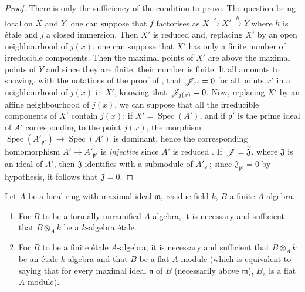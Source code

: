 \begin{proof}
There is only the sufficiency of the condition to prove.
The question being local on $X$ and $Y$, one can suppose  that $f$ factorises as $X\xrightarrow{j}X'\xrightarrow{h}Y$ where $h$ is \'etale and $j$ a closed immersion.
Then $X'$ is reduced  and, replacing $X'$ by an open neighbourhood of $j(x)$, one can suppose that $X'$ has only a finite number of irreducible components.
Then the maximal points of $X'$ are above the maximal points of $Y$  and since they are finite, their number is finite.
It all amounts to showing, with the notations of the proof of , that $\mathscr{J}_{x'}=0$ for all points $x'$ in a neighbourhood of $j(x)$ in $X'$, knowing that $\mathscr{J}_{j(x)}=0$.
Now, replacing $X'$ by an affine neighbourhood of $j(x)$, we can suppose that all the irreducible components of $X'$ contain $j(x)$;
if $X'=\operatorname{Spec}(A')$, and if $\mathfrak{p}'$ is the prime ideal of $A'$ corresponding to the point $j(x)$, the morphism $\operatorname{Spec}(A'_{\mathfrak{p}'})\to\operatorname{Spec}(A')$ is dominant, hence the corresponding homomorphism $A'\to A'_{\mathfrak{p}'}$ is \emph{injective} since $A'$ is reduced .
If $\mathscr{J}=\widetilde{\mathfrak{J}}$, where $\mathfrak{J}$ is an ideal of $A'$, then $\mathfrak{J}$ identifies with a submodule of $A'_{\mathfrak{p}'}$; since $\mathfrak{J}_{\mathfrak{p}'}=0$ by hypothesis, it follows that $\mathfrak{J}=0$.
\end{proof}

\begin{corollary}[18.4.14]
\label{IV.18.4.14}
Let $A$ be a local ring with maximal ideal $\mathfrak{m}$, residue field $k$, $B$ a finite $A$-algebra.
\begin{enumerate}
  \item[\textup{(i)}] For $B$ to be a formally unramified $A$-algebra, it is necessary and sufficient that $B\otimes_A k$ be a $k$-algebra \'etale.
  \item[\textup{(ii)}] For $B$ to be a finite \'etale $A$-algebra, it is necessary and sufficient that $B\otimes_A k$ be an \'etale $k$-algebra and that $B$ be a flat $A$-module \textup{(which is equivalent to saying  that for every maximal ideal $\mathfrak{n}$ of $B$ (necessarily above $\mathfrak{m}$), $B_\mathfrak{n}$ is a flat $A$-module).}
\end{enumerate}
\end{corollary}

